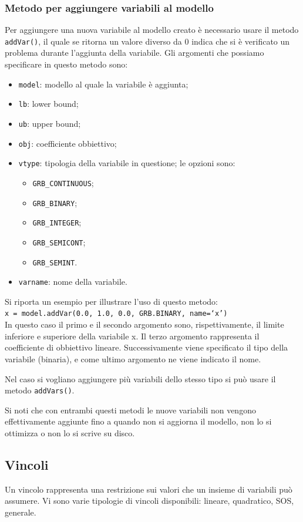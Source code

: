 \subsubsection*{Metodo per aggiungere variabili al modello}
Per aggiungere una nuova variabile al modello creato è necessario usare il metodo \texttt{addVar()}, il quale se ritorna un valore diverso da 0 indica che si è verificato un problema durante l'aggiunta della variabile.
Gli argomenti che possiamo specificare in questo metodo sono:
\begin{itemize}
\item \texttt{model}: modello al quale la variabile è aggiunta;
\item \texttt{lb}: lower bound;
\item \texttt{ub}: upper bound;
\item \texttt{obj}: coefficiente obbiettivo;
\item \texttt{vtype}: tipologia della variabile in questione;
le opzioni sono:
\begin{itemize}
\item \texttt{GRB\_CONTINUOUS};
\item \texttt{GRB\_BINARY};
\item \texttt{GRB\_INTEGER};
\item \texttt{GRB\_SEMICONT};
\item \texttt{GRB\_SEMINT}.
\end{itemize}
\item \texttt{varname}: nome della variabile.
\end{itemize}

Si riporta un esempio per illustrare l'uso di questo metodo:\\
\texttt{x = model.addVar(0.0, 1.0, 0.0, GRB.BINARY, name=`x')}\\
In questo caso il primo e il secondo argomento sono, rispettivamente, il limite inferiore e superiore della variabile x. Il terzo argomento rappresenta il coefficiente di obbiettivo lineare. Successivamente viene specificato il tipo della variabile (binaria), e come ultimo argomento ne viene indicato il nome.

Nel caso si vogliano aggiungere più variabili dello stesso tipo si può usare il metodo \texttt{addVars()}.

Si noti che con entrambi questi metodi le nuove variabili non vengono effettivamente aggiunte fino a quando non si aggiorna il modello, non lo si ottimizza o non lo si  scrive su disco.

\subsection{Vincoli}
Un vincolo rappresenta una restrizione sui valori che un insieme di variabili può assumere. Vi sono varie tipologie di vincoli disponibili: lineare, quadratico, SOS, generale.

